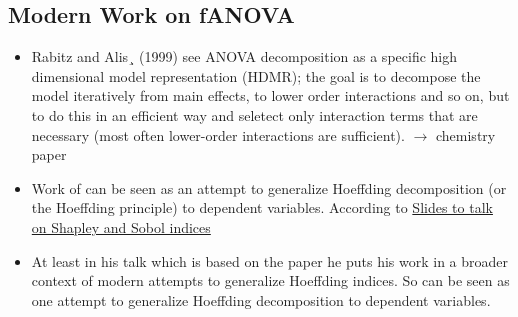 \subsection{Modern Work on fANOVA}
\begin{itemize}
    \item Rabitz and Alis¸ (1999) see ANOVA decomposition as a specific high dimensional model representation (HDMR); the goal is to decompose the model iteratively from main effects, to lower order interactions and so on, but to do this in an efficient way and seletect only interaction terms that are necessary (most often lower-order interactions are sufficient). $\rightarrow$ chemistry paper
    \item Work of \cite{hooker_generalized_2007} can be seen as an attempt to generalize Hoeffding decomposition (or the Hoeffding principle) to dependent variables. According to \href{https://static1.squarespace.com/static/5f704d21e5464d602d153738/t/66ec27cadf4e8d42ed9018d0/1726752718798/20240918_SADiscord_MIL.pdf}{Slides to talk on Shapley and Sobol indices}
    \item At least in his talk which is based on the paper \cite{il_idrissi_hoeffding_2025} he puts his work in a broader context of modern attempts to generalize Hoeffding indices. So \cite{il_idrissi_hoeffding_2025} can be seen as one attempt to generalize Hoeffding decomposition to dependent variables.
\end{itemize}


